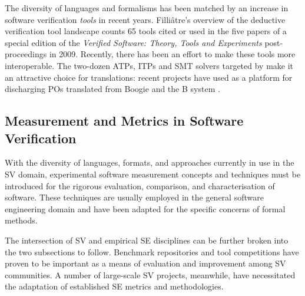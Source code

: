 The diversity of languages and formalisms has been matched by an increase in software verification \textit{tools} in recent years. Filli{\^a}tre's overview of the deductive verification tool landscape \cite{deductiveSV} counts 65 tools cited or used in the five papers of a special edition of the \textit{Verified Software: Theory, Tools and Experiments} post-proceedings in 2009. Recently, there has been an effort to make these tools more interoperable. The two-dozen ATPs, ITPs and SMT solvers targeted by \why make it an attractive choice for translations: recent projects have used \why as a platform for discharging POs translated from Boogie \cite{b2w} and the B system \cite{rodinplugin,atelierB2w}. 

\subsection{Measurement and Metrics in Software Verification}
\label{sub:lrsvmm}

With the diversity of languages, formats, and approaches currently in use in the SV domain, experimental software measurement concepts and techniques must be introduced for the rigorous evaluation, comparison, and characterisation of software. These techniques are usually employed in the general software engineering domain and have been adapted for the specific concerns of formal methods. 

The intersection of SV and empirical SE disciplines can be further broken into the two subsections to follow. 
Benchmark repositories and tool competitions have proven to be important as a means of evaluation and improvement among SV communities. A number of large-scale SV projects, meanwhile, have necessitated the adaptation of established SE metrics and methodologies.         
 
